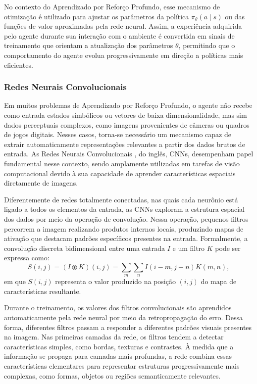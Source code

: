 No contexto do Aprendizado por Reforço Profundo, esse mecanismo de otimização é utilizado para ajustar os parâmetros da política $\pi_\theta(a \mid s)$ ou das funções de valor aproximadas pela rede neural. Assim, a experiência adquirida pelo agente durante sua interação com o ambiente é convertida em sinais de treinamento que orientam a atualização dos parâmetros $\theta$, permitindo que o comportamento do agente evolua progressivamente em direção a políticas mais eficientes.

\subsubsection{Redes Neurais Convolucionais}

Em muitos problemas de Aprendizado por Reforço Profundo, o agente não recebe como entrada estados simbólicos ou vetores de baixa dimensionalidade, mas sim dados perceptuais complexos, como imagens provenientes de câmeras ou quadros de jogos digitais. Nesses casos, torna-se necessário um mecanismo capaz de extrair automaticamente representações relevantes a partir dos dados brutos de entrada. As Redes Neurais Convolucionais \cite{cnn}, do inglês, CNNs, desempenham papel fundamental nesse contexto, sendo amplamente utilizadas em tarefas de visão computacional devido à sua capacidade de aprender características espaciais diretamente de imagens.

Diferentemente de redes totalmente conectadas, nas quais cada neurônio está ligado a todos os elementos da entrada, as CNNs exploram a estrutura espacial dos dados por meio da operação de convolução. Nessa operação, pequenos filtros percorrem a imagem realizando produtos internos locais, produzindo mapas de ativação que destacam padrões específicos presentes na entrada. Formalmente, a convolução discreta bidimensional entre uma entrada $I$ e um filtro $K$ pode ser expressa como:
$$
S(i,j) = (I \circledast K)(i,j) = \sum_m \sum_n I(i-m, j-n)K(m,n),
$$
em que $S(i,j)$ representa o valor produzido na posição $(i,j)$ do mapa de características resultante.

Durante o treinamento, os valores dos filtros convolucionais são aprendidos automaticamente pela rede neural por meio da retropropagação do erro. Dessa forma, diferentes filtros passam a responder a diferentes padrões visuais presentes na imagem. Nas primeiras camadas da rede, os filtros tendem a detectar características simples, como bordas, texturas e contrastes. À medida que a informação se propaga para camadas mais profundas, a rede combina essas características elementares para representar estruturas progressivamente mais complexas, como formas, objetos ou regiões semanticamente relevantes.

